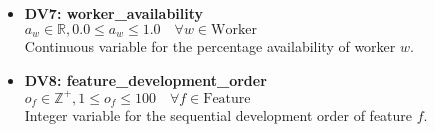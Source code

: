 \documentclass[11pt]{article}
\begin{document}
\begin{itemize}
    \item \textbf{DV7: worker\_availability} \\
    $a_w \in \mathbb{R}, 0.0 \leq a_w \leq 1.0 \quad \forall w \in \text{Worker}$ \\
    Continuous variable for the percentage availability of worker $w$.
    
    \item \textbf{DV8: feature\_development\_order} \\
    $o_f \in \mathbb{Z}^+, 1 \leq o_f \leq 100 \quad \forall f \in \text{Feature}$ \\
    Integer variable for the sequential development order of feature $f$.
\end{itemize}
\end{document}
